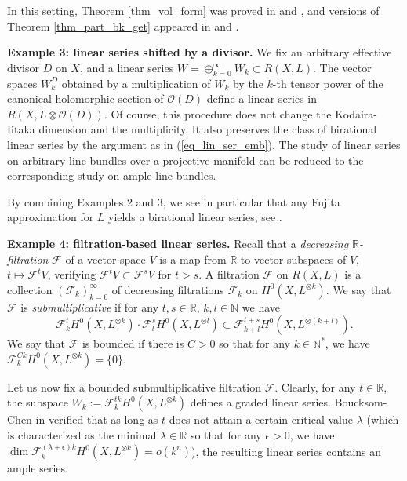 \documentclass[12pt]{article}
\numberwithin{equation}{section}
\theoremstyle{theorem}
\theoremstyle{definition}
\theoremstyle{remark}
\newcommand{\real}{\mathbb{R}}
\newcommand{\nat}{\mathbb{N}}
\begin{document}
	In this setting, Theorem \ref{thm_vol_form} was proved in \cite{MatsumuraRestr} and \cite{HisamResBerg}, and versions of Theorem \ref{thm_part_bk_get} appeared in \cite{HisamResBerg} and \cite{ComanMarinNguyenRest}.
	\par 
	\textbf{Example 3: linear series shifted by a divisor.}
	We fix an arbitrary effective divisor $D$ on $X$, and a linear series $W = \oplus_{k = 0}^{\infty} W_k \subset R(X, L)$.
	The vector spaces $W_k^D$ obtained by a multiplication of $W_k$ by the $k$-th tensor power of the canonical holomorphic section of $\mathscr{O}(D)$ define a linear series in $R(X, L \otimes \mathscr{O}(D))$.
	Of course, this procedure does not change the Kodaira-Iitaka dimension and the multiplicity.
	It also preserves the class of birational linear series by the argument as in (\ref{eq_lin_ser_emb}).
	The study of linear series on arbitrary line bundles over a projective manifold can be reduced to the corresponding study on ample line bundles.
	\par 
	By combining Examples 2 and 3, we see in particular that any Fujita approximation for $L$ yields a birational linear series, see \cite[Definition 11.4.3 and Theorem 11.4.4]{LazarBookII}.
	\par 
	\textbf{Example 4: filtration-based linear series.}
	Recall that a \textit{decreasing $\real$-filtration} $\mathcal{F}$ of a vector space $V$ is a map from $\real$ to vector subspaces of $V$, $t \mapsto \mathcal{F}^t V$, verifying $\mathcal{F}^t V \subset \mathcal{F}^s V$ for $t > s$.
	A filtration $\mathcal{F}$ on $R(X, L)$ is a collection $(\mathcal{F}_k)_{k = 0}^{\infty}$ of decreasing filtrations $\mathcal{F}_k$ on $H^0(X, L^{\otimes k})$.
	We say that $\mathcal{F}$ is \textit{submultiplicative} if for any $t, s \in \real$, $k, l \in \nat$ we have 
	\begin{equation}\label{eq_sumb_filt}
		\mathcal{F}^t_k H^0(X, L^{\otimes k}) \cdot \mathcal{F}^s_l H^0(X, L^{\otimes l}) \subset \mathcal{F}^{t + s}_{k + l} H^0(X, L^{\otimes (k + l)}).
	\end{equation}
	We say that $\mathcal{F}$ is bounded if there is $C > 0$ so that for any $k \in \nat^*$, we have $\mathcal{F}^{Ck}_k H^0(X, L^{\otimes k}) = \{0\}$.
	\par 
	Let us now fix a bounded submultiplicative filtration $\mathcal{F}$.
	Clearly, for any $t \in \real$, the subspace $W_k := \mathcal{F}^{tk}_k H^0(X, L^{\otimes k})$ defines a graded linear series.
	Boucksom-Chen in \cite[Lemma 1.6]{BouckChen} verified that as long as $t$ does not attain a certain critical value $\lambda$ (which is characterized as the minimal $\lambda \in \real$ so that for any $\epsilon > 0$, we have $\dim \mathcal{F}^{(\lambda + \epsilon)k}_k H^0(X, L^{\otimes k}) = o(k^n)$), the resulting linear series contains an ample series.
\end{document}
